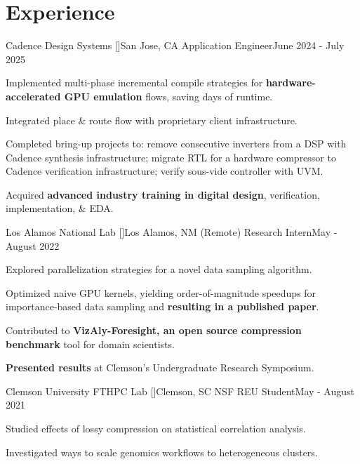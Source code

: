 \section{\textbf{Experience}}
\vspace{-0.4mm}
\resumeSubHeadingListStart

\resumeSubheading
{Cadence Design Systems [\href{https://www.cadence.com/en_US/home.html}{}]}{San Jose, CA}
{Application Engineer}{June 2024 - July 2025}
\resumeItemListStart
    \item Implemented multi-phase incremental compile strategies for \textbf{hardware-accelerated GPU emulation} flows, saving days of runtime.
    \item Integrated place \& route flow with proprietary client infrastructure.
    \item Completed bring-up projects to: remove consecutive inverters from a DSP with Cadence synthesis infrastructure; migrate RTL for a hardware compressor to Cadence verification infrastructure; verify sous-vide controller with UVM.
    \item Acquired \textbf{advanced industry training in digital design}, verification, implementation, \& EDA.
\resumeItemListEnd 


\resumeSubheading
{Los Alamos National Lab [\href{https://www.lanl.gov}{}]}{Los Alamos, NM (Remote)}
{Research Intern}{May - August 2022}
\resumeItemListStart
    \item Explored parallelization strategies for a novel data sampling algorithm.
    \item Optimized naive GPU kernels, yielding order-of-magnitude speedups for importance-based data sampling and \textbf{resulting in a published paper}.
    \item Contributed to \textbf{VizAly-Foresight, an open source compression benchmark} tool for domain scientists.
    \item \textbf{Presented results} at Clemson's Undergraduate Research Symposium.
\resumeItemListEnd

\resumeSubheading
{Clemson University FTHPC Lab [\href{https://jonccal.people.clemson.edu}{}]}{Clemson, SC}
{NSF REU Student}{May - August 2021}
\resumeItemListStart
    \item Studied effects of lossy compression on statistical correlation analysis.
    \item Investigated ways to scale genomics workflows to heterogeneous clusters.
\resumeItemListEnd

